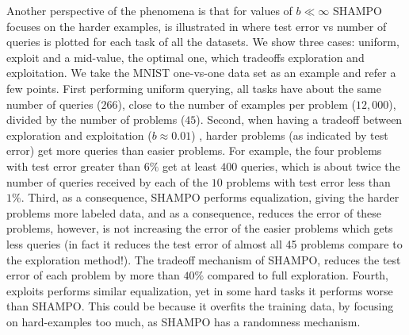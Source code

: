 Another perspective of the phenomena is that for values of $b\ll \infty$ SHAMPO focuses on the harder 
examples, is illustrated in  where test error vs number of queries is plotted for each 
task of all the datasets. We show three cases: uniform, exploit and a mid-value, the optimal one, which 
tradeoffs exploration and exploitation. We take the MNIST one-vs-one data set as an example and 
refer a few points. First performing uniform querying, all 
tasks have about the same number of queries ($266$), close to the number of examples per problem 
($12,000$), divided by the number of problems ($45$). Second, when having a tradeoff between exploration 
and exploitation ($b\approx 0.01$) , harder problems (as indicated by test error) get more queries than easier problems. 
For example, the four problems with test error greater than $6\%$ get at least $400$ queries, which is 
about twice the number of queries received by each of the $10$ problems with test error less than $1\%$. 
Third, as a consequence, SHAMPO performs equalization, giving the harder problems more labeled data, 
and as a consequence, reduces the error of these problems, however, is not increasing the error of the 
easier problems which gets less queries (in fact it reduces the test error of almost all 45 problems compare 
to the exploration method!). 
The tradeoff mechanism of SHAMPO, reduces the test error of each problem by more than $40\%$ 
compared to full exploration. Fourth, exploits performs similar equalization, yet in some hard tasks it 
performs worse than SHAMPO. This could be because it overfits the training data, by focusing on 
hard-examples too much, as SHAMPO has a randomness mechanism.

